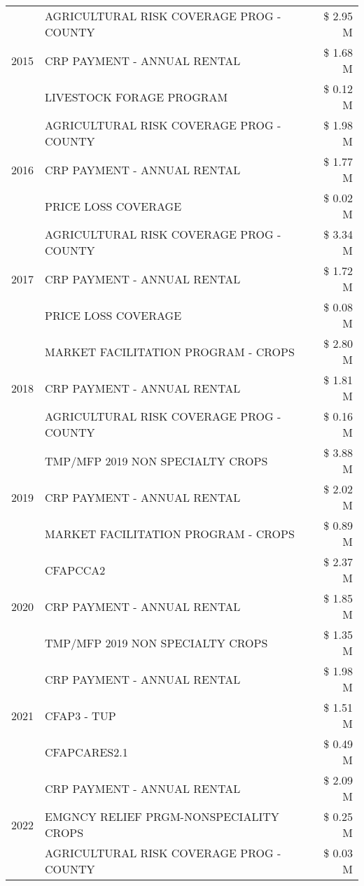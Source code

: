 \begin{tabular}{llr}
\multirow[t]{3}{*}{2015} & AGRICULTURAL RISK COVERAGE PROG - COUNTY & \$ 2.95 M \\
 & CRP PAYMENT - ANNUAL RENTAL & \$ 1.68 M \\
 & LIVESTOCK FORAGE PROGRAM & \$ 0.12 M \\
\cline{1-3}
\multirow[t]{3}{*}{2016} & AGRICULTURAL RISK COVERAGE PROG - COUNTY & \$ 1.98 M \\
 & CRP PAYMENT - ANNUAL RENTAL & \$ 1.77 M \\
 & PRICE LOSS COVERAGE & \$ 0.02 M \\
\cline{1-3}
\multirow[t]{3}{*}{2017} & AGRICULTURAL RISK COVERAGE PROG - COUNTY & \$ 3.34 M \\
 & CRP PAYMENT - ANNUAL RENTAL & \$ 1.72 M \\
 & PRICE LOSS COVERAGE & \$ 0.08 M \\
\cline{1-3}
\multirow[t]{3}{*}{2018} & MARKET FACILITATION PROGRAM - CROPS & \$ 2.80 M \\
 & CRP PAYMENT - ANNUAL RENTAL & \$ 1.81 M \\
 & AGRICULTURAL RISK COVERAGE PROG - COUNTY & \$ 0.16 M \\
\cline{1-3}
\multirow[t]{3}{*}{2019} & TMP/MFP 2019 NON SPECIALTY CROPS & \$ 3.88 M \\
 & CRP PAYMENT - ANNUAL RENTAL & \$ 2.02 M \\
 & MARKET FACILITATION PROGRAM - CROPS & \$ 0.89 M \\
\cline{1-3}
\multirow[t]{3}{*}{2020} & CFAPCCA2 & \$ 2.37 M \\
 & CRP PAYMENT - ANNUAL RENTAL & \$ 1.85 M \\
 & TMP/MFP 2019 NON SPECIALTY CROPS & \$ 1.35 M \\
\cline{1-3}
\multirow[t]{3}{*}{2021} & CRP PAYMENT - ANNUAL RENTAL & \$ 1.98 M \\
 & CFAP3 - TUP & \$ 1.51 M \\
 & CFAPCARES2.1 & \$ 0.49 M \\
\cline{1-3}
\multirow[t]{3}{*}{2022} & CRP PAYMENT - ANNUAL RENTAL & \$ 2.09 M \\
 & EMGNCY RELIEF PRGM-NONSPECIALITY CROPS & \$ 0.25 M \\
 & AGRICULTURAL RISK COVERAGE PROG - COUNTY & \$ 0.03 M \\
\cline{1-3}
\bottomrule
\end{tabular}
